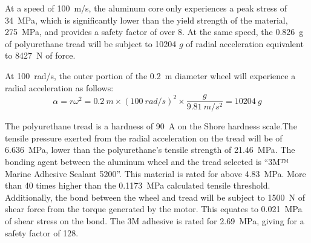 \documentclass[main.tex]{subfiles}
\begin{document}
    At a speed of \SI{100}{m/s}, the aluminum core only experiences a peak stress of \SI{34}{MPa}, which is significantly lower than the yield strength of the material, \SI{275}{MPa}, and provides a safety factor of over 8. At the same speed, the \SI{0.826}{g} of polyurethane tread will be subject to 10204 $g$ of radial acceleration equivalent to \SI{8427}{N} of force.\\
    \begin{center}
    At \SI{100}{rad/s}, the outer portion of the \SI{0.2}{m} diameter wheel will experience a radial acceleration as follows:
    	\[
  		\alpha=r\omega^2=\SI{0.2}{m}\times (\SI{100}{rad/s})^2 \times \frac{g}{\SI{9.81}{m/s^2}}= 10204\ g
   		\]
    \end{center}
    
    The polyurethane tread is a hardness of \SI{90}{A} on the Shore hardness scale.The tensile pressure exerted from the radial acceleration on the tread will be of \SI{6.636}{MPa}, lower than the polyurethane's tensile strength of \SI{21.46}{MPa}. The bonding agent between the aluminum wheel and the tread selected is ``3M™ Marine Adhesive Sealant 5200''. This material is rated for above \SI{4.83}{MPa}. More than 40 times higher than the \SI{0.1173}{MPa} calculated tensile threshold. Additionally, the bond between the wheel and tread will be subject to \SI{1500}{N} of shear force from the torque generated by the motor. This equates to \SI{0.021}{MPa} of shear stress on the bond. The 3M adhesive is rated for \SI{2.69}{MPa}, giving for a safety factor of 128. \\
\end{document}
